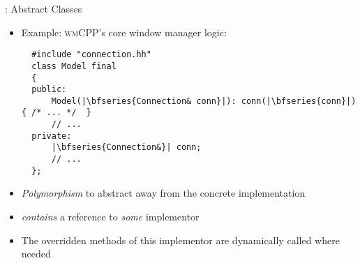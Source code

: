 \begin{frame}[c,fragile]{\underline{\cpp}: Abstract Classes \hfill {\footnotesize \currentname}}


    \begin{itemize}

        \item Example: \textsc{wmCPP}'s core window manager logic:\\
\begin{verbatim}
  #include "connection.hh"
  class Model final
  {
  public:
      Model(|\bfseries{Connection& conn}|): conn(|\bfseries{conn}|) { /* ... */  }
      // ...
  private:
      |\bfseries{Connection&}| conn;
      // ...
  };
\end{verbatim}

        \item \textit{Polymorphism} to abstract away from the concrete implementation\\

        \item {} \textit{contains} a reference to \textit{some}  implementor\\

        \item The overridden methods of this implementor are dynamically called where needed\\

    \end{itemize}

    \vfill

\end{frame}

